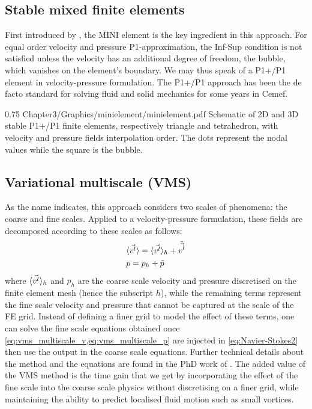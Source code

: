 \subsection{Stable mixed finite elements}
First introduced by \citet{arnold_stable_1984}, the MINI element is the key ingredient in this approach.
For equal order velocity and pressure P1-approximation, the Inf-Sup condition is not satisfied unless the velocity
has an additional degree of freedom, the bubble, which vanishes on the element's boundary. We may thus speak of a
P1+/P1 element in velocity-pressure formulation. The P1+/P1 approach has been the de facto standard for solving fluid 
and solid mechanics for some years in Cemef.
%
\begin{figureth}
{0.75}
{Chapter3/Graphics/minielement/minielement.pdf}
{Schematic of 2D and 3D stable P1+/P1 finite elements, respectively triangle and tetrahedron, with velocity and pressure fields interpolation order.
The dots represent the nodal values while the square is the bubble.}
\label{fig:minielement}
\end{figureth}
%
\subsection{Variational multiscale (VMS)}
As the name indicates, this approach considers two scales of phenomena: the coarse and fine scales. Applied to a velocity-pressure
formulation, these fields are decomposed according to these scales as follows:
\begin{align}
\label{eq:vms_multiscale_v}
 &\langle \vec{v^l} \rangle = \langle \vec{v^l} \rangle_h + \tilde{\vec{v^l}} \\ 
\label{eq:vms_multiscale_p}
 &p = p_h + \tilde{p}
\end{align}
where $\langle \vec{v^l} \rangle_h$ and $p_h$ are the coarse scale velocity and pressure discretised on the finite element mesh (hence the subscript $h$), 
while the remaining terms represent the fine scale velocity and pressure that cannot be captured at the scale of the FE grid. Instead 
of defining a finer grid to model the effect of these terms, one can solve the fine scale equations obtained once \cref{eq:vms_multiscale_v,eq:vms_multiscale_p}
are injected in \cref{eq:Navier-Stokes2} then use the output in the coarse scale equations. Further technical details about the method and the equations are
found in the PhD work of \citet{hachem_stabilized_2009}. The added value of the VMS method is the time gain that we get by incorporating the effect of the fine scale into the 
coarse scale physics without discretising on a finer grid, while maintaining the ability to predict localised fluid motion such as small vortices.
%
%
